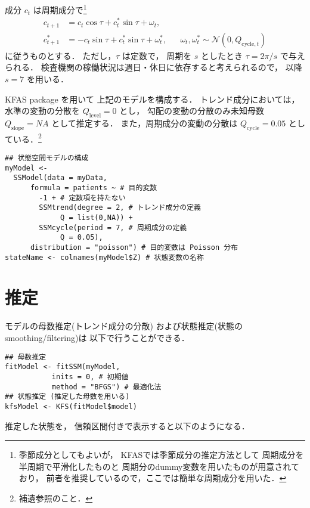 \documentclass[10pt,oneside,fleqn]{scrartcl}
\begin{document}
成分 \(c_{t}\) は周期成分で\footnote{季節成分としてもよいが，
KFASでは季節成分の推定方法として
周期成分を半周期で平滑化したものと
周期分のdummy変数を用いたものが用意されており，
前者を推奨しているので，ここでは簡単な周期成分を用いた．}
\begin{align}
  c_{t+1}
  &=c_{t}\cos\tau+c^{*}_{t}\sin\tau+\omega_{t},\\
  c^{*}_{t+1}
  &=-c_{t}\sin\tau+c^{*}_{t}\sin\tau+\omega^{*}_{t},
  &&\omega_{t},\omega^{*}_{t}\sim\mathcal{N}(0,Q_{\mathrm{cycle},t})
\end{align}
に従うものとする．
ただし，\(\tau\) は定数で，
周期を \(s\) としたとき
\(\tau=2\pi/s\) で与えられる．
検査機関の稼働状況は週日・休日に依存すると考えられるので，
以降 \(s=7\) を用いる．

KFAS package を用いて
上記のモデルを構成する．
トレンド成分においては，
水準の変動の分散を \(Q_{\mathrm{level}}=0\)
とし，
勾配の変動の分散のみ未知母数 \(Q_{\mathrm{slope}}=NA\) として推定する．
また，周期成分の変動の分散は \(Q_{\mathrm{cycle}}=0.05\) としている．\footnote{補遺参照のこと．}

\begin{verbatim}
## 状態空間モデルの構成
myModel <-
  SSModel(data = myData, 
	  formula = patients ~ # 目的変数
	    -1 + # 定数項を持たない
	    SSMtrend(degree = 2, # トレンド成分の定義
		     Q = list(0,NA)) +
	    SSMcycle(period = 7, # 周期成分の定義
		     Q = 0.05),
	  distribution = "poisson") # 目的変数は Poisson 分布
stateName <- colnames(myModel$Z) # 状態変数の名称 
\end{verbatim}

\section{推定}
\label{sec:orgb7832b5}

モデルの母数推定(トレンド成分の分散)
および状態推定(状態のsmoothing/filtering)は
以下で行うことができる．

\begin{verbatim}
## 母数推定
fitModel <- fitSSM(myModel, 
		   inits = 0, # 初期値
		   method = "BFGS") # 最適化法
## 状態推定 (推定した母数を用いる)
kfsModel <- KFS(fitModel$model)
\end{verbatim}

推定した状態を，
信頼区間付きで表示すると以下のようになる．

\begin{figure}[htbp]
  \centering
  \myGraph[1]{}
\end{figure}
\end{document}
